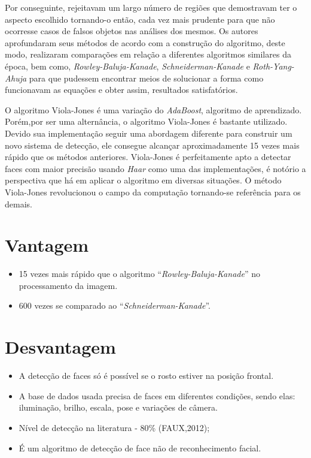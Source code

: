 \documentclass[12pt,a4paper]{article}
\begin{document}
Por conseguinte, rejeitavam um largo número de regiões que demostravam ter o aspecto escolhido tornando-o então, cada vez mais prudente para que não ocorresse casos de falsos objetos nas análises dos mesmos. Os autores aprofundaram seus métodos de acordo com a construção do algoritmo, deste modo, realizaram comparações em relação a diferentes algoritmos similares da época, bem como, \textit{Rowley-Baluja-Kanade}, \textit{Schneiderman-Kanade} e\textit{ Roth-Yang-Ahuja} para que pudessem encontrar meios de solucionar a forma como funcionavam as equações e obter assim, resultados satisfatórios. 

O algoritmo Viola-Jones é uma variação do \textit{AdaBoost}, algoritmo de aprendizado. Porém,por ser uma alternância, o algoritmo Viola-Jones é bastante utilizado. Devido sua implementação seguir uma abordagem diferente para construir um novo sistema de detecção, ele consegue alcançar aproximadamente 15 vezes mais rápido que os métodos anteriores. Viola-Jones é perfeitamente apto a detectar faces com maior precisão usando \textit{Haar} como uma das implementações, é notório a perspectiva que há em aplicar o algoritmo em diversas situações. O método Viola-Jones revolucionou o campo da computação tornando-se referência para os demais.

\section{Vantagem}
\begin{itemize}
	\item 15 vezes mais rápido que o algoritmo “\textit{Rowley-Baluja-Kanade}” no processamento da imagem.

	\item 600 vezes se comparado ao “\textit{Schneiderman-Kanade}”.
\end{itemize}

\section{Desvantagem}
\begin{itemize}
	\item A detecção de faces só é possível se o rosto estiver na posição frontal.
	\item A base de dados usada precisa de faces em diferentes condições, sendo elas: iluminação, brilho, escala, pose e variações de câmera.
	\item Nível de detecção na literatura - 80\% (FAUX,2012);
	\item É um algoritmo de detecção de face não de reconhecimento facial.
\end{itemize}
\end{document}
